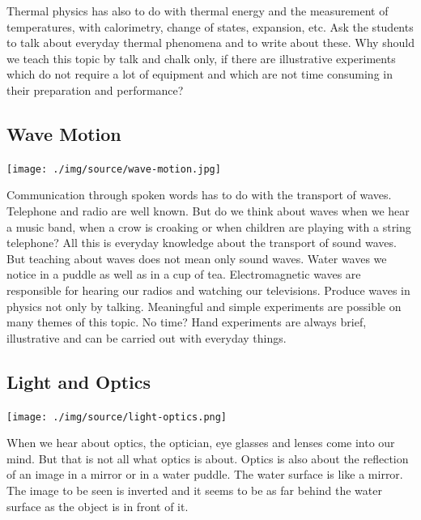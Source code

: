 \begin{multicols}{2}
Thermal physics has also to do with thermal energy and the measurement of temperatures,
with calorimetry, change of states, expansion, etc. Ask the students to talk about everyday
thermal phenomena and to write about these. Why should we teach this topic by talk and
chalk only, if there are illustrative experiments which do not require a lot of equipment and
which are not time consuming in their preparation and performance?

\subsection{Wave Motion}

\begin{center}
\texttt{[image: ./img/source/wave-motion.jpg]}
\end{center}

Communication through spoken words has to do with the transport of waves. Telephone and
radio are well known. But do we think about waves when we hear a music band, when a crow
is croaking or when children are playing with a string telephone? All this is everyday knowledge about the transport of sound waves.\\

But teaching about waves does not mean only sound waves. Water waves we notice in a puddle as well as in a cup of tea. Electromagnetic waves are responsible for hearing our radios and watching our televisions.
Produce waves in physics not only by talking. Meaningful and simple experiments are
possible on many themes of this topic. No time? Hand experiments are always brief,
illustrative and can be carried out with everyday things.

\subsection{Light and Optics}

\begin{center}
\texttt{[image: ./img/source/light-optics.png]}
\end{center}

When we hear about optics, the optician, eye glasses and lenses come into our mind. But that
is not all what optics is about. Optics is also about the reflection of an image in a mirror or in a
water puddle. The water surface is like a mirror. The image to be seen is inverted and it
seems to be as far behind the water surface as the object is in front of it.\\


\end{multicols}
